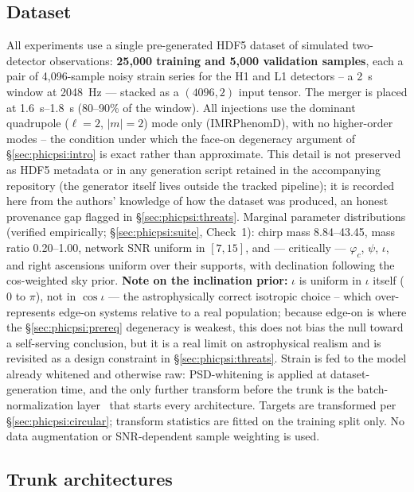 \subsection{Dataset}
\label{sec:phicpsi:dataset}

All experiments use a single pre-generated HDF5 dataset of simulated two-detector observations: \textbf{25{,}000 training and 5{,}000 validation samples}, each a pair of 4{,}096-sample noisy strain series for the H1 and L1 detectors – a \SI{2}{\second} window at \SI{2048}{\hertz} --- stacked as a $(4096, 2)$ input tensor.
The merger is placed at \SIrange{1.6}{1.8}{\second} (80--90\% of the window).
All injections use the dominant quadrupole ($\ell=2$, $|m|=2$) mode only (IMRPhenomD), with no higher-order modes – the condition under which the face-on degeneracy argument of \S\ref{sec:phicpsi:intro} is exact rather than approximate.
This detail is not preserved as HDF5 metadata or in any generation script retained in the accompanying repository (the generator itself lives outside the tracked pipeline); it is recorded here from the authors' knowledge of how the dataset was produced, an honest provenance gap flagged in \S\ref{sec:phicpsi:threats}.
Marginal parameter distributions (verified empirically; \S\ref{sec:phicpsi:suite}, Check~1): chirp mass \SIrange{8.84}{43.45}{\solarmass}, mass ratio 0.20--1.00, network SNR uniform in $[7, 15]$, and --- critically --- $\varphi_c$, $\psi$, $\iota$, and right ascensions uniform over their supports, with declination following the cos-weighted sky prior.
\textbf{Note on the inclination prior:} $\iota$ is uniform in $\iota$ itself ($0$ to $\pi$), not in $\cos\iota$ --- the astrophysically correct isotropic choice – which over-represents edge-on systems relative to a real population; because edge-on is where the \S\ref{sec:phicpsi:prereq} degeneracy is weakest, this does not bias the null toward a self-serving conclusion, but it is a real limit on astrophysical realism and is revisited as a design constraint in \S\ref{sec:phicpsi:threats}.
Strain is fed to the model already whitened and otherwise raw: PSD-whitening is applied at dataset-generation time, and the only further transform before the trunk is the batch-normalization layer~\citep{ioffe2015batchnorm} that starts every architecture.
Targets are transformed per \S\ref{sec:phicpsi:circular}; transform statistics are fitted on the training split only.
No data augmentation or SNR-dependent sample weighting is used.

\subsection{Trunk architectures}
\label{sec:phicpsi:trunks}

